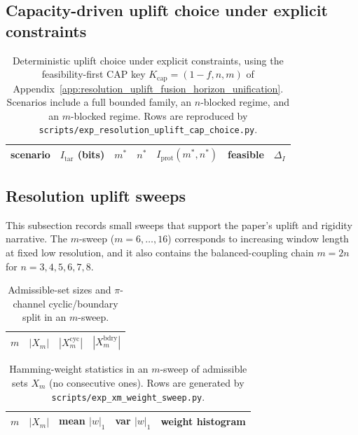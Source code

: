 \subsection{Capacity-driven uplift choice under explicit constraints}



\begin{table}[H]
\centering
\scriptsize
\setlength{\tabcolsep}{6pt}
\renewcommand{\arraystretch}{1.15}
\begin{tabular}{l r r r r l r}
\toprule
scenario & $I_{\mathrm{tar}}$ (bits) & $m^\ast$ & $n^\ast$ & $I_{\mathrm{prot}}(m^\ast,n^\ast)$ & feasible & $\Delta_I$ \\
\midrule
%
\end{tabular}
\caption{Deterministic uplift choice under explicit constraints, using the feasibility-first CAP key $K_{\mathrm{cap}}=(1-f,n,m)$ of Appendix~\ref{app:resolution_uplift_fusion_horizon_unification}. Scenarios include a full bounded family, an $n$-blocked regime, and an $m$-blocked regime. Rows are reproduced by \texttt{scripts/exp\_resolution\_uplift\_cap\_choice.py}.}
\label{tab:resolution_uplift_cap_choice}
\end{table}

\subsection{Resolution uplift sweeps}

This subsection records small sweeps that support the paper's uplift and rigidity narrative.
The $m$-sweep ($m=6,\dots,16$) corresponds to increasing window length at fixed low resolution,
and it also contains the balanced-coupling chain $m=2n$ for $n=3,4,5,6,7,8$.

\begin{table}[H]
\centering
\small
\setlength{\tabcolsep}{10pt}
\renewcommand{\arraystretch}{1.15}
\begin{tabular}{rrrr}
\toprule
$m$ & $|X_m|$ & $|X_m^{\mathrm{cyc}}|$ & $|X_m^{\mathrm{bdry}}|$ \\
\midrule
%
\end{tabular}
\caption{Admissible-set sizes and $\pi$-channel cyclic/boundary split in an $m$-sweep.}
\label{tab:xm_sweep}
\end{table}

\begin{table}[H]
\centering
\scriptsize
\setlength{\tabcolsep}{6pt}
\renewcommand{\arraystretch}{1.15}
\begin{tabular}{rrrrl}
\toprule
$m$ & $|X_m|$ & mean $|w|_1$ & var $|w|_1$ & weight histogram \\
\midrule
%
\end{tabular}
\caption{Hamming-weight statistics in an $m$-sweep of admissible sets $X_m$ (no consecutive ones). Rows are generated by \texttt{scripts/exp\_xm\_weight\_sweep.py}.}
\label{tab:xm_weight_sweep}
\end{table}

